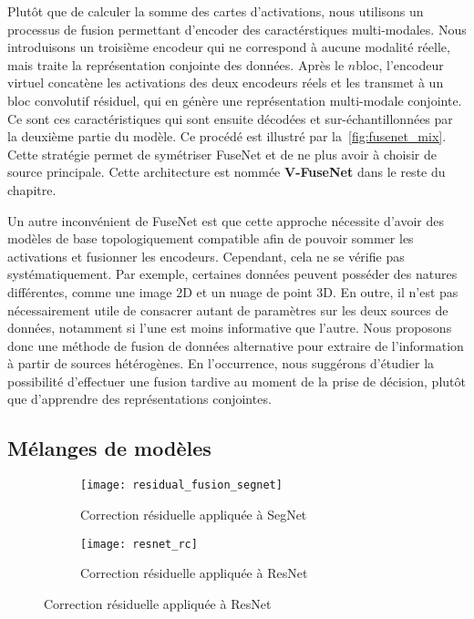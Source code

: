 Plutôt que de calculer la somme des cartes d'activations, nous utilisons un processus de fusion permettant d'encoder des caractérstiques multi-modales. Nous introduisons un troisième encodeur qui ne correspond à aucune modalité réelle, mais traite la représentation conjointe des données. Après le $n$\ieme bloc, l'encodeur virtuel concatène les activations des deux encodeurs réels et les transmet à un bloc convolutif résiduel, qui en génère une représentation multi-modale conjointe. Ce sont ces caractéristiques qui sont ensuite décodées et sur-échantillonnées par la deuxième partie du modèle. Ce procédé est illustré par la~\cref{fig:fusenet_mix}. Cette stratégie permet de symétriser FuseNet et de ne plus avoir à choisir de source principale. Cette architecture est nommée \textbf{V-FuseNet} dans le reste du chapitre.

Un autre inconvénient de FuseNet est que cette approche nécessite d'avoir des modèles de base topologiquement compatible afin de pouvoir sommer les activations et fusionner les encodeurs. Cependant, cela ne se vérifie pas systématiquement. Par exemple, certaines données peuvent posséder des natures différentes, comme une image 2D et un nuage de point 3D. En outre, il n'est pas nécessairement utile de consacrer autant de paramètres sur les deux sources de données, notamment si l'une est moins informative que l'autre. Nous proposons donc une méthode de fusion de données alternative pour extraire de l'information à partir de sources hétérogènes. En l'occurrence, nous suggérons d'étudier la possibilité d'effectuer une fusion tardive au moment de la prise de décision, plutôt que d'apprendre des représentations conjointes.

\subsection{Mélanges de modèles}

\begin{figure}[h]
   \begin{subfigure}{0.5\textwidth}
     \texttt{[image: residual\_fusion\_segnet]}
     \caption{Correction résiduelle appliquée à SegNet}
     \label{fig:residual_correction}
   \end{subfigure}
   \begin{subfigure}{0.5\textwidth}
     \texttt{[image: resnet\_rc]}
     \caption{Correction résiduelle appliquée à ResNet}
     \label{fig:residual_correction_resnet}
   \end{subfigure}
\end{figure}

